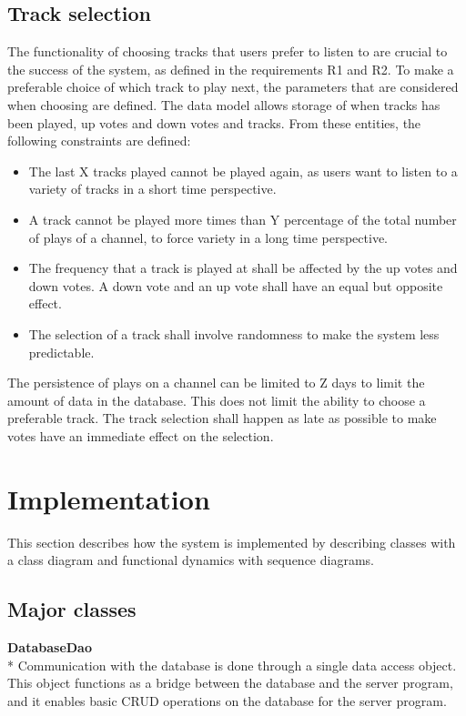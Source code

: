 \documentclass[a4paper,11pt,report]{article}
\begin{document}
\subsection{Track selection}
The functionality of choosing tracks that users prefer to listen to are crucial to the success of the system, as defined in the requirements R1 and R2. To make a preferable choice of which track to play next, the parameters that are considered when choosing are defined. The data model allows storage of when tracks has been played, up votes and down votes and tracks. From these entities, the following constraints are defined:
\begin{itemize}
\item The last X tracks played cannot be played again, as users want to listen to a variety of tracks in a short time perspective.
\item A track cannot be played more times than Y percentage of the total number of plays of a channel, to force variety in a long time perspective.
\item The frequency that a track is played at shall be affected by the up votes and down votes. A down vote and an up vote shall have an equal but opposite effect.
\item The selection of a track shall involve randomness to make the system less predictable.
\end{itemize}
The persistence of plays on a channel can be limited to Z days to limit the amount of data in the database. This does not limit the ability to choose a preferable track. The track selection shall happen as late as possible to make votes have an immediate effect on the selection. 

\section{Implementation}
This section describes how the system is implemented by describing classes with a class diagram and functional dynamics with sequence diagrams.

\subsection{Major classes}
\textbf{DatabaseDao} \\*
Communication with the database is done through a single data access object. This object functions as a bridge between the database and the server program, and it enables basic CRUD operations on the database for the server program. 
\end{document}
